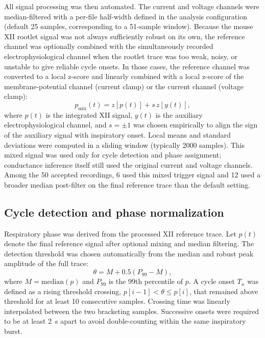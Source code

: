 \documentclass[11pt]{article}
\begin{document}
All signal processing was then automated. The current and voltage channels were median-filtered with a per-file half-width defined in the analysis configuration (default 25 samples, corresponding to a 51-sample window). Because the mouse XII rootlet signal was not always sufficiently robust on its own, the reference channel was optionally combined with the simultaneously recorded electrophysiological channel when the rootlet trace was too weak, noisy, or unstable to give reliable cycle onsets. In those cases, the reference channel was converted to a local z-score and linearly combined with a local z-score of the membrane-potential channel (current clamp) or the current channel (voltage clamp):
\begin{equation}
p_{\mathrm{mix}}(t) = z\!\left[p(t)\right] + s\,z\!\left[y(t)\right],
\end{equation}
where $p(t)$ is the integrated XII signal, $y(t)$ is the auxiliary electrophysiological channel, and $s=\pm 1$ was chosen empirically to align the sign of the auxiliary signal with inspiratory onset. Local means and standard deviations were computed in a sliding window (typically 2000 samples). This mixed signal was used only for cycle detection and phase assignment; conductance inference itself still used the original current and voltage channels. Among the 50 accepted recordings, 6 used this mixed trigger signal and 12 used a broader median post-filter on the final reference trace than the default setting.

\subsection{Cycle detection and phase normalization}
Respiratory phase was derived from the processed XII reference trace. Let $p(t)$ denote the final reference signal after optional mixing and median filtering. The detection threshold was chosen automatically from the median and robust peak amplitude of the full trace:
\begin{equation}
\theta = M + 0.5\left(P_{99} - M\right),
\end{equation}
where $M=\mathrm{median}(p)$ and $P_{99}$ is the 99th percentile of $p$. A cycle onset $T_n$ was defined as a rising threshold crossing, $p[i-1] < \theta \le p[i]$, that remained above threshold for at least 10 consecutive samples. Crossing time was linearly interpolated between the two bracketing samples. Successive onsets were required to be at least 2~s apart to avoid double-counting within the same inspiratory burst.
\end{document}

